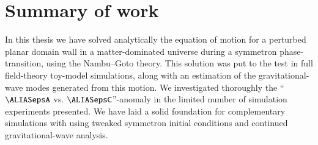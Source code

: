 















\section{Summary of work}
    In this thesis we have solved analytically the equation of motion for a perturbed planar domain wall in a matter-dominated universe during a symmetron phase-transition, using the Nambu--Goto theory. This solution was put to the test in full field-theory toy-model simulations, along with an estimation of the gravitational-wave modes generated from this motion. We investigated thoroughly the ``$\epsA$ vs. $\epsC$''-anomaly in the limited number of simulation experiments presented. We have laid a solid foundation for complementary simulations with \asgrd{} using tweaked symmetron initial conditions and continued gravitational-wave analysis.





    
 

